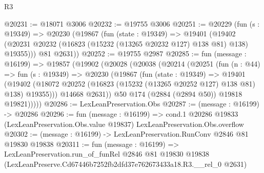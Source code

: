 \begin{lexlean}{R3}
\begin{coremodule}
@20231 := @18071 @3006
@20232 := @19755 @3006
@20251 := @20229
    (fun (s : @19349) =>
    @20230
      (@19867
        (fun (state : @19349) =>
        @19401 (@19402 (@20231 @20232 (@16823 (@15232 (@13265 @20232 @127) @138 @81) @138) @19355)))
        @81
        @2631))
@20252 := @19755 @2987
@20285 := fun (message : @16199) =>
  @19857
    (@19902
      (@20028
        (@20038
          (@20214
            (@20251
              (fun (n : @44) =>
              fun (s : @19349) =>
              @20230
                (@19867
                  (fun (state : @19349) =>
                  @19401
                    (@19402
                      (@18072 @20252 (@16823 (@15232 (@13265 @20252 @127) @138 @81) @138) @19355)))
                  @14668
                  @2631))
              @50
              @174
              (@2884 (@2894 @50))
              @19818
              @19821)))))
@20286 := LexLeanPreservation.Obs
@20287 := (message : @16199) -> @20286
@20296 := fun (message : @16199) =>
  cond.{1} @20286 @19833 (LexLeanPreservation.Obs.value @19837) LexLeanPreservation.Obs.overflow
@20302 := (message : @16199) -> LexLeanPreservation.RunConv @2846 @81 @19830 @19838
@20311 := fun (message : @16199) =>
  LexLeanPreservation.run_of_funRel
    @2846
    @81
    @19830
    @19838
    (LexLeanPreserve.Cd67446b7252fb2dfd37e762673433a18.R3.__rel_0 @2631)
\end{coremodule}
\end{lexlean}
